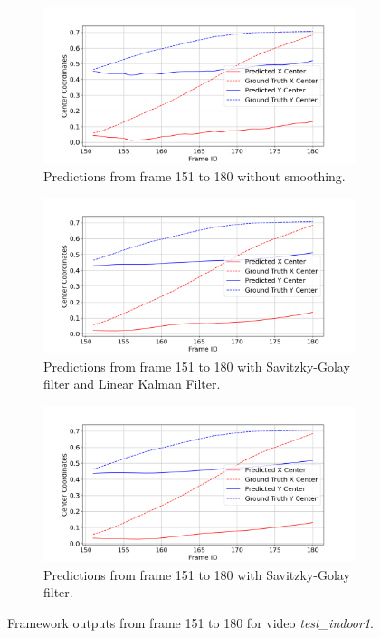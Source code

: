 \documentclass[12pt,oneside]{book} %
\begin{document}
\begin{figure}[H]
    \centering
    \begin{subfigure}[t]{0.9\textwidth}
        \includegraphics[width=\textwidth]{figures/framework/test_indoor1 Raw Data - 3.png}
        \caption{Predictions from frame 151 to 180 without smoothing.}
        \label{fig:framework-test_indoor1-3-raw}
    \end{subfigure}
    \hfill
    \begin{subfigure}[t]{0.9\textwidth}
        \includegraphics[width=\textwidth]{figures/framework/test_indoor1 LKF SA Filter - 3.png}
        \caption{Predictions from frame 151 to 180 with Savitzky-Golay filter and Linear Kalman Filter.}
        \label{fig:framework-test_indoor1-3-sa-lkf}
    \end{subfigure}
    \vfill
    \begin{subfigure}[t]{0.9\textwidth}
        \includegraphics[width=\textwidth]{figures/framework/test_indoor1 SA Filter - 3.png}
        \caption{Predictions from frame 151 to 180 with Savitzky-Golay filter.}
        \label{fig:framework-test_indoor1-3-sa}
    \end{subfigure}
    \caption{Framework outputs from frame 151 to 180 for video \textit{test\_indoor1}.}
    \label{fig:framework-test_indoor1-3}
\end{figure}
\end{document}
